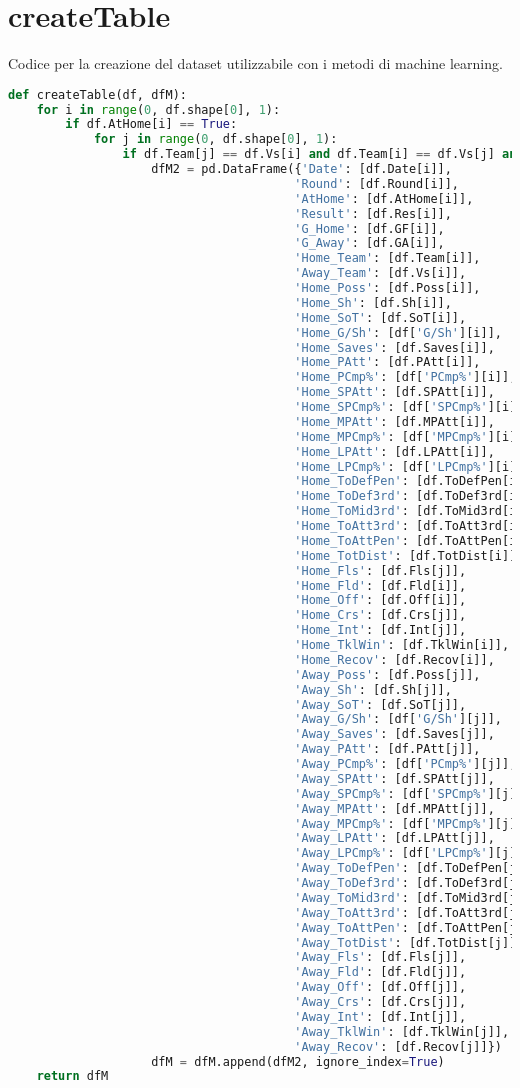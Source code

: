 \section{createTable}
Codice per la creazione del dataset utilizzabile con i metodi di machine learning.
\begin{lstlisting}[language=Python, caption={Codice per la creazione del dataset utilizabile con i metodi di machine learning.}, captionpos=b, label=code:a9]
def createTable(df, dfM): 
	for i in range(0, df.shape[0], 1):
		if df.AtHome[i] == True: 
			for j in range(0, df.shape[0], 1): 
				if df.Team[j] == df.Vs[i] and df.Team[i] == df.Vs[j] and df.AtHome[j] == False:
					dfM2 = pd.DataFrame({'Date': [df.Date[i]],
										'Round': [df.Round[i]],
										'AtHome': [df.AtHome[i]],
										'Result': [df.Res[i]],
										'G_Home': [df.GF[i]],
										'G_Away': [df.GA[i]],
										'Home_Team': [df.Team[i]],
										'Away_Team': [df.Vs[i]],
										'Home_Poss': [df.Poss[i]],
										'Home_Sh': [df.Sh[i]],
										'Home_SoT': [df.SoT[i]],
										'Home_G/Sh': [df['G/Sh'][i]],
										'Home_Saves': [df.Saves[i]],
										'Home_PAtt': [df.PAtt[i]],
										'Home_PCmp%': [df['PCmp%'][i]],
										'Home_SPAtt': [df.SPAtt[i]],
										'Home_SPCmp%': [df['SPCmp%'][i]],
										'Home_MPAtt': [df.MPAtt[i]],
										'Home_MPCmp%': [df['MPCmp%'][i]],
										'Home_LPAtt': [df.LPAtt[i]],
										'Home_LPCmp%': [df['LPCmp%'][i]],
										'Home_ToDefPen': [df.ToDefPen[i]],
										'Home_ToDef3rd': [df.ToDef3rd[i]],
										'Home_ToMid3rd': [df.ToMid3rd[i]],
										'Home_ToAtt3rd': [df.ToAtt3rd[i]],
										'Home_ToAttPen': [df.ToAttPen[i]],
										'Home_TotDist': [df.TotDist[i]],
										'Home_Fls': [df.Fls[j]],
										'Home_Fld': [df.Fld[i]],
										'Home_Off': [df.Off[i]],
										'Home_Crs': [df.Crs[j]],
										'Home_Int': [df.Int[j]],
										'Home_TklWin': [df.TklWin[i]],
										'Home_Recov': [df.Recov[i]],
										'Away_Poss': [df.Poss[j]],
										'Away_Sh': [df.Sh[j]],
										'Away_SoT': [df.SoT[j]],
										'Away_G/Sh': [df['G/Sh'][j]],
										'Away_Saves': [df.Saves[j]],
										'Away_PAtt': [df.PAtt[j]],
										'Away_PCmp%': [df['PCmp%'][j]],
										'Away_SPAtt': [df.SPAtt[j]],
										'Away_SPCmp%': [df['SPCmp%'][j]],
										'Away_MPAtt': [df.MPAtt[j]],
										'Away_MPCmp%': [df['MPCmp%'][j]],
										'Away_LPAtt': [df.LPAtt[j]],
										'Away_LPCmp%': [df['LPCmp%'][j]],
										'Away_ToDefPen': [df.ToDefPen[j]],
										'Away_ToDef3rd': [df.ToDef3rd[j]],
										'Away_ToMid3rd': [df.ToMid3rd[j]],
										'Away_ToAtt3rd': [df.ToAtt3rd[j]],
										'Away_ToAttPen': [df.ToAttPen[j]],
										'Away_TotDist': [df.TotDist[j]],
										'Away_Fls': [df.Fls[j]],
										'Away_Fld': [df.Fld[j]],
										'Away_Off': [df.Off[j]],
										'Away_Crs': [df.Crs[j]],
										'Away_Int': [df.Int[j]],
										'Away_TklWin': [df.TklWin[j]],
										'Away_Recov': [df.Recov[j]]})
					dfM = dfM.append(dfM2, ignore_index=True) 
	return dfM
	
\end{lstlisting}